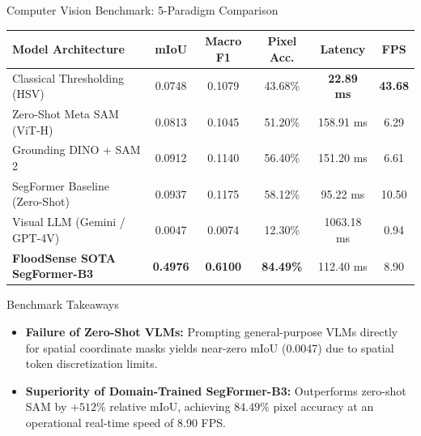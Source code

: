 \documentclass[aspectratio=169, 10pt, professionalfonts]{beamer}
\begin{document}
\begin{frame}{Computer Vision Benchmark: 5-Paradigm Comparison}
  \begin{table}[h]
    \footnotesize
    \centering
    \begin{tabularx}{\textwidth}{l C C C C C}
      \toprule
      \textbf{Model Architecture} & \textbf{mIoU} & \textbf{Macro F1} & \textbf{Pixel Acc.} & \textbf{Latency} & \textbf{FPS} \\
      \midrule
      Classical Thresholding (HSV) & 0.0748 & 0.1079 & 43.68\% & \textbf{22.89 ms} & \textbf{43.68} \\
      Zero-Shot Meta SAM (ViT-H) & 0.0813 & 0.1045 & 51.20\% & 158.91 ms & 6.29 \\
      Grounding DINO + SAM 2 & 0.0912 & 0.1140 & 56.40\% & 151.20 ms & 6.61 \\
      SegFormer Baseline (Zero-Shot) & 0.0937 & 0.1175 & 58.12\% & 95.22 ms & 10.50 \\
      Visual LLM (Gemini / GPT-4V) & 0.0047 & 0.0074 & 12.30\% & 1063.18 ms & 0.94 \\
      \midrule
      \textbf{FloodSense SOTA SegFormer-B3} & \textbf{0.4976} & \textbf{0.6100} & \textbf{84.49\%} & 112.40 ms & 8.90 \\
      \bottomrule
    \end{tabularx}
  \end{table}

  \begin{block}{Benchmark Takeaways}
    \begin{itemize}\setlength{\itemsep}{0.3em}\footnotesize
      \item \textbf{Failure of Zero-Shot VLMs:} Prompting general-purpose VLMs directly for spatial coordinate masks yields near-zero mIoU (0.0047) due to spatial token discretization limits.
      \item \textbf{Superiority of Domain-Trained SegFormer-B3:} Outperforms zero-shot SAM by \textbf{$+512\%$} relative mIoU, achieving $84.49\%$ pixel accuracy at an operational real-time speed of 8.90 FPS.
    \end{itemize}
  \end{block}
\end{frame}
\end{document}
